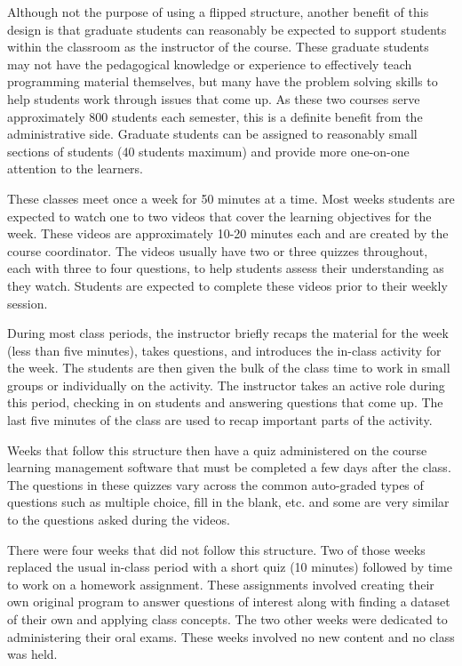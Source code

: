 \documentclass[
  letterpaper,
  DIV=11,
  numbers=noendperiod]{scrartcl}
\begin{document}
Although not the purpose of using a flipped structure, another benefit
of this design is that graduate students can reasonably be expected to
support students within the classroom as the instructor of the course.
These graduate students may not have the pedagogical knowledge or
experience to effectively teach programming material themselves, but
many have the problem solving skills to help students work through
issues that come up. As these two courses serve approximately 800
students each semester, this is a definite benefit from the
administrative side. Graduate students can be assigned to reasonably
small sections of students (40 students maximum) and provide more
one-on-one attention to the learners.

These classes meet once a week for 50 minutes at a time. Most weeks
students are expected to watch one to two videos that cover the learning
objectives for the week. These videos are approximately 10-20 minutes
each and are created by the course coordinator. The videos usually have
two or three quizzes throughout, each with three to four questions, to
help students assess their understanding as they watch. Students are
expected to complete these videos prior to their weekly session.

During most class periods, the instructor briefly recaps the material
for the week (less than five minutes), takes questions, and introduces
the in-class activity for the week. The students are then given the bulk
of the class time to work in small groups or individually on the
activity. The instructor takes an active role during this period,
checking in on students and answering questions that come up. The last
five minutes of the class are used to recap important parts of the
activity.

Weeks that follow this structure then have a quiz administered on the
course learning management software that must be completed a few days
after the class. The questions in these quizzes vary across the common
auto-graded types of questions such as multiple choice, fill in the
blank, etc. and some are very similar to the questions asked during the
videos.

There were four weeks that did not follow this structure. Two of those
weeks replaced the usual in-class period with a short quiz (10 minutes)
followed by time to work on a homework assignment. These assignments
involved creating their own original program to answer questions of
interest along with finding a dataset of their own and applying class
concepts. The two other weeks were dedicated to administering their oral
exams. These weeks involved no new content and no class was held.
\end{document}
